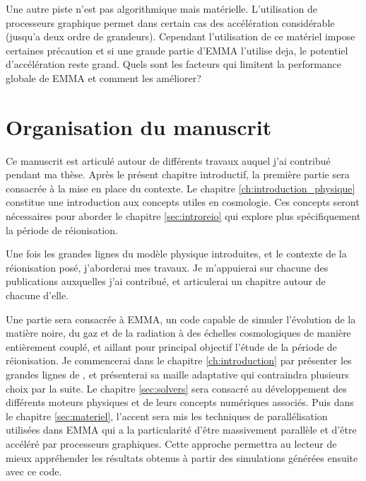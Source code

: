 Une autre piste n'est pas algorithmique mais matérielle.
L'utilisation de processeurs graphique permet dans certain cas des accélération considérable (jusqu'a deux ordre de grandeurs).
Cependant l'utilisation de ce matériel impose certaines précaution et si une grande partie d'EMMA l'utilise deja, le potentiel d'accélération reste grand.
Quels sont les facteurs qui limitent la performance globale de EMMA et comment les améliorer?





\section{Organisation du manuscrit}

Ce manuscrit est articulé autour de différents travaux auquel j'ai contribué pendant ma thèse.
Après le présent chapitre introductif, la première partie sera consacrée à la mise en place du contexte.
Le chapitre \ref{ch:introduction_physique} constitue une introduction aux concepts utiles en cosmologie.
Ces concepts seront nécessaires pour aborder le chapitre \ref{sec:introreio} qui explore plus spécifiquement la période de réionisation.

Une fois les grandes lignes du modèle physique introduites, et le contexte de la réionisation posé, j'aborderai mes travaux.
Je m'appuierai sur chacune des publications auxquelles j'ai contribué, et articulerai un chapitre autour de chacune d'elle. 

Une partie sera consacrée à EMMA, un code capable de simuler l'évolution de la matière noire, du gaz et de la radiation à des échelles cosmologiques de manière entièrement couplé, et aillant pour principal objectif l'étude de la période de réionisation.
Je commencerai dans le chapitre \ref{ch:introduction} par présenter les grandes lignes de \emma, et présenterai sa maille adaptative qui contraindra plusieurs choix par la suite.
Le chapitre \ref{sec:solvers} sera consacré au développement des différents moteurs physiques et de leurs concepts numériques associés.
Puis dans le chapitre \ref{sec:materiel}, l'accent sera mis les techniques de parallélisation utilisées dans EMMA qui a la particularité d'être massivement parallèle et d'être accéléré par processeurs graphiques.
Cette approche permettra au lecteur de mieux appréhender les résultats obtenus à partir des simulations générées ensuite avec ce code.

